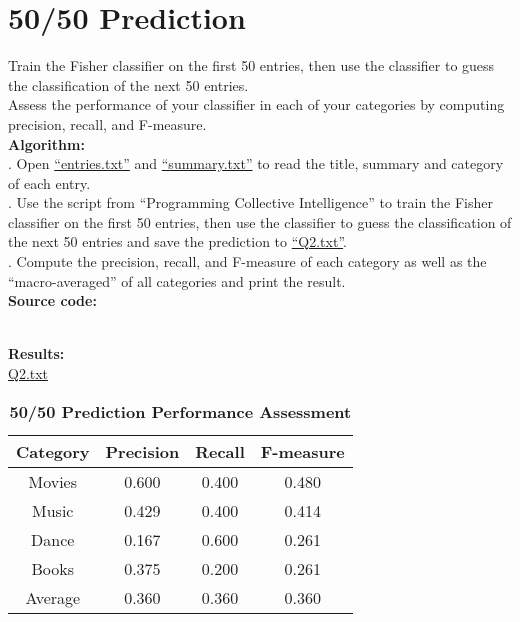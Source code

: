 \documentclass{article}
\begin{document}
		\section{50/50 Prediction}
		Train the Fisher classifier on the first 50 entries, then use the classifier to guess the classification of the
next 50 entries.\\
		\indent Assess the performance of your classifier in each of your categories by computing precision, recall, and F-measure.\\

		\noindent\textbf{Algorithm:}\\
		. Open \href{https://github.com/zhangboroy/cs532-s17/blob/master/assg09_submission/entries.txt}{``entries.txt''} and \href{https://github.com/zhangboroy/cs532-s17/blob/master/assg09_submission/summary.txt}{``summary.txt''} to read the title, summary and category of each entry.\\
		. Use the script from ``Programming Collective Intelligence'' to train the Fisher classifier on the first 50 entries, then use the classifier to guess the classification of the next 50 entries and save the prediction to \href{https://github.com/zhangboroy/cs532-s17/blob/master/assg09_submission/Q2.txt}{``Q2.txt''}.\\
		. Compute the precision, recall, and F-measure of each category as well as the ``macro-averaged''
of all categories and print the result.\\

		\noindent\textbf{Source code:}
		

		\noindent\\\textbf{Results:}\\
		\indent\href{https://github.com/zhangboroy/cs532-s17/blob/master/assg09_submission/Q2.txt}{Q2.txt}\\
		\begin{table}[!htb]
			\centering
			\caption{\textbf{50/50 Prediction Performance Assessment}}
			\begin{tabular}{cccc}
				\toprule
				\textbf{Category} & \textbf{Precision} & \textbf{Recall} & \textbf{F-measure}\\
				\midrule
				Movies & 0.600 & 0.400 & 0.480\\
				Music & 0.429 & 0.400 & 0.414\\
				Dance & 0.167 & 0.600 & 0.261\\
				Books & 0.375 & 0.200 & 0.261\\
				Average & 0.360 & 0.360 & 0.360\\				
				\bottomrule
			\end{tabular}
		\end{table}
\end{document}
